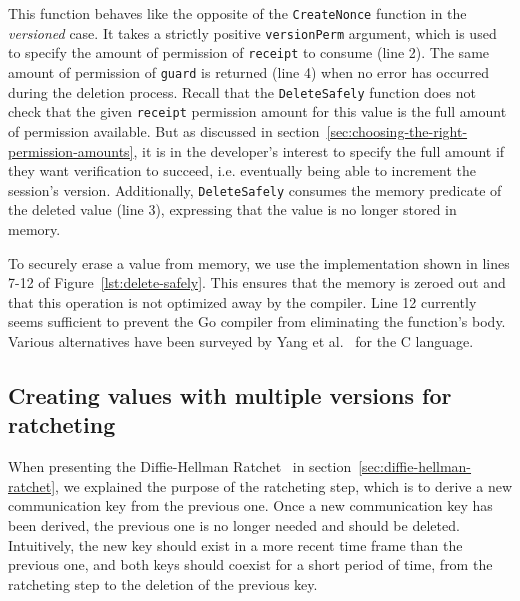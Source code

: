 This function behaves like the opposite of the \texttt{CreateNonce} function in the \emph{versioned} case.
It takes a strictly positive \texttt{versionPerm} argument, which is used to specify the amount of permission of \texttt{receipt} to consume (line 2).
The same amount of permission of \texttt{guard} is returned (line 4) when no error has occurred during the deletion process.
Recall that the \texttt{DeleteSafely} function does not check that the given \texttt{receipt} permission amount for this value is the full amount of permission available.
But as discussed in section~\ref{sec:choosing-the-right-permission-amounts}, it is in the developer's interest to specify the full amount if they want verification to succeed, i.e. eventually being able to increment the session's version.
Additionally, \texttt{DeleteSafely} consumes the memory predicate of the deleted value (line 3), expressing that the value is no longer stored in memory.

To securely erase a value from memory, we use the implementation shown in lines 7-12 of Figure~\ref{lst:delete-safely}.
This ensures that the memory is zeroed out and that this operation is not optimized away by the compiler.
Line 12 currently seems sufficient to prevent the Go compiler from eliminating the function's body.
Various alternatives have been surveyed by Yang et al.~\cite{yang2017dead} for the C language.

\subsection{Creating values with multiple versions for ratcheting}
\label{sec:creating-values-with-multiple-versions-for-ratcheting}

When presenting the Diffie-Hellman Ratchet~\cite{perrin2016double} in section~\ref{sec:diffie-hellman-ratchet}, we explained the purpose of the ratcheting step, which is to derive a new communication key from the previous one. Once a new communication key has been derived, the previous one is no longer needed and should be deleted.
Intuitively, the new key should exist in a more recent time frame than the previous one, and both keys should coexist for a short period of time, from the ratcheting step to the deletion of the previous key.

